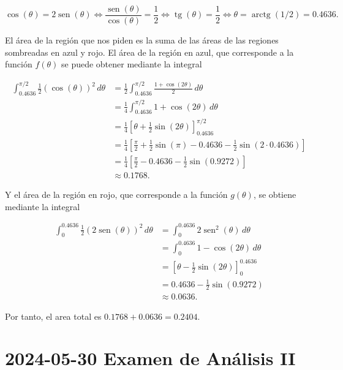 \documentclass[
  a4paper,
]{scrreport}
\theoremstyle{definition}
\theoremstyle{remark}
\begin{document}
\begin{tcolorbox}
\[
\cos(\theta) = 2\operatorname{sen}(\theta)
\Leftrightarrow \frac{\operatorname{sen}(\theta)}{\cos(\theta)} = \frac{1}{2}
\Leftrightarrow \operatorname{tg}(\theta) = \frac{1}{2}
\Leftrightarrow \theta = \operatorname{arctg}(1/2) = 0.4636.
\]

El área de la región que nos piden es la suma de las áreas de las
regiones sombreadas en azul y rojo. El área de la región en azul, que
corresponde a la función \(f(\theta)\) se puede obtener mediante la
integral

\begin{align*}
\int_{0.4636}^{\pi/2} \frac{1}{2}(\cos(\theta))^2\, d\theta
&= \frac{1}{2} \int_{0.4636}^{\pi/2} \frac{1 + \cos(2\theta)}{2}\, d\theta \\
&= \frac{1}{4} \int_{0.4636}^{\pi/2} 1 + \cos(2\theta)\, d\theta \\
&= \frac{1}{4} \left[\theta + \frac{1}{2}\sin(2\theta)\right]_{0.4636}^{\pi/2} \\
&= \frac{1}{4} \left[\frac{\pi}{2} + \frac{1}{2}\sin(\pi) - 0.4636 - \frac{1}{2}\sin(2\cdot 0.4636)\right] \\
&= \frac{1}{4} \left[\frac{\pi}{2} - 0.4636 - \frac{1}{2}\sin(0.9272)\right] \\
&\approx 0.1768.
\end{align*}

Y el área de la región en rojo, que corresponde a la función
\(g(\theta)\), se obtiene mediante la integral

\begin{align*}
\int_{0}^{0.4636} \frac{1}{2}(2\operatorname{sen}(\theta))^2\, d\theta 
&= \int_{0}^{0.4636} 2\operatorname{sen}^2(\theta)\, d\theta \\
&= \int_{0}^{0.4636} 1 - \cos(2\theta)\, d\theta \\
&= \left[\theta - \frac{1}{2}\sin(2\theta)\right]_{0}^{0.4636} \\
&= 0.4636 - \frac{1}{2}\sin(0.9272) \\
&\approx 0.0636.
\end{align*}

Por tanto, el area total es \(0.1768 + 0.0636 = 0.2404\).

\end{tcolorbox}


\chapter{\texorpdfstring{2024-05-30 Examen de Análisis
II}{2024-05-30  Examen de Análisis II}}\label{examen-de-anuxe1lisis-ii-3}
\end{document}
